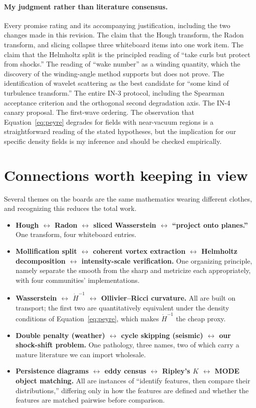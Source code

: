 \documentclass[11pt]{article}
\begin{document}
\paragraph{My judgment rather than literature consensus.}
Every promise rating and its accompanying justification, including the two changes made in
this revision. The claim that the Hough transform, the Radon transform, and slicing collapse
three whiteboard items into one work item. The claim that the Helmholtz split is the
principled reading of ``take curls but protect from shocks.'' The reading of ``wake number''
as a winding quantity, which the discovery of the winding-angle method supports but does not
prove. The identification of wavelet scattering as the best candidate for ``some kind of
turbulence transform.'' The entire IN-3 protocol, including the Spearman acceptance criterion
and the orthogonal second degradation axis. The IN-4 canary proposal. The first-wave
ordering. The observation that Equation~\eqref{eq:peyre} degrades for fields with
near-vacuum regions is a straightforward reading of the stated hypotheses, but the
implication for our specific density fields is my inference and should be checked
empirically.

\section{Connections worth keeping in view}

Several themes on the boards are the same mathematics wearing different clothes, and
recognizing this reduces the total work.

\begin{itemize}[leftmargin=*]
\item \textbf{Hough $\leftrightarrow$ Radon $\leftrightarrow$ sliced Wasserstein
$\leftrightarrow$ ``project onto planes.''} One transform, four whiteboard entries.
\item \textbf{Mollification split $\leftrightarrow$ coherent vortex extraction
$\leftrightarrow$ Helmholtz decomposition $\leftrightarrow$ intensity-scale verification.}
One organizing principle, namely separate the smooth from the sharp and metricize each
appropriately, with four communities' implementations.
\item \textbf{Wasserstein $\leftrightarrow$ $\dot H^{-1}$ $\leftrightarrow$ Ollivier--Ricci
curvature.} All are built on transport; the first two are quantitatively equivalent under the
density conditions of Equation~\eqref{eq:peyre}, which makes $\dot H^{-1}$ the cheap proxy.
\item \textbf{Double penalty (weather) $\leftrightarrow$ cycle skipping (seismic)
$\leftrightarrow$ our shock-shift problem.} One pathology, three names, two of which carry a
mature literature we can import wholesale.
\item \textbf{Persistence diagrams $\leftrightarrow$ eddy census $\leftrightarrow$ Ripley's
$K$ $\leftrightarrow$ MODE object matching.} All are instances of ``identify features, then
compare their distributions,'' differing only in how the features are defined and whether the
features are matched pairwise before comparison.
\end{itemize}
\end{document}

